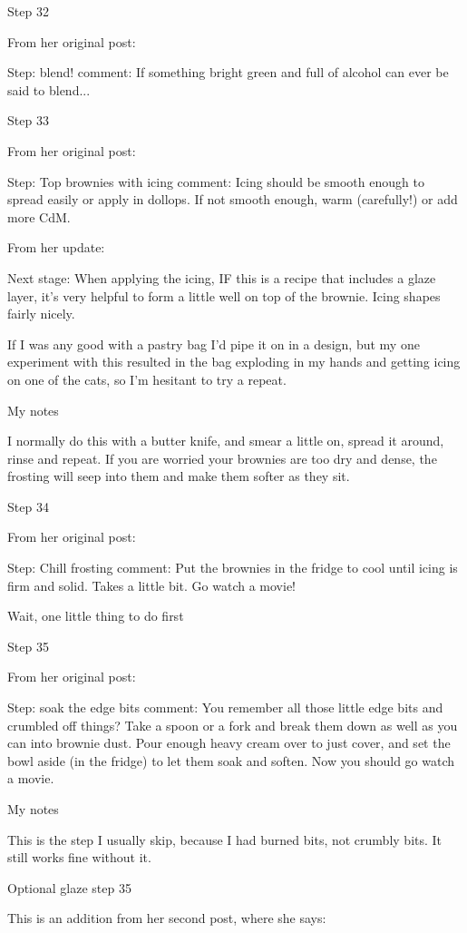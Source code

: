 Step 32

From her original post:

Step: blend!
comment: If something bright green and full of alcohol can ever be said to blend...

Step 33

From her original post:

Step: Top brownies with icing
comment: Icing should be smooth enough to spread easily or apply in dollops. If not smooth enough, warm (carefully!) or add more CdM.

From her update:

Next stage: When applying the icing, IF this is a recipe that includes a glaze layer, it's very helpful to form a little well on top of the brownie. Icing shapes fairly nicely.

If I was any good with a pastry bag I'd pipe it on in a design, but my one experiment with this resulted in the bag exploding in my hands and getting icing on one of the cats, so I'm hesitant to try a repeat.

My notes

I normally do this with a butter knife, and smear a little on, spread it around, rinse and repeat. If you are worried your brownies are too dry and dense, the frosting will seep into them and make them softer as they sit.

Step 34

From her original post:

Step: Chill frosting
comment: Put the brownies in the fridge to cool until icing is firm and solid. Takes a little bit. Go watch a movie!

Wait, one little thing to do first

Step 35

From her original post:

Step: soak the edge bits
comment: You remember all those little edge bits and crumbled off things? Take a spoon or a fork and break them down as well as you can into brownie dust. Pour enough heavy cream over to just cover, and set the bowl aside (in the fridge) to let them soak and soften.
Now you should go watch a movie.

My notes

This is the step I usually skip, because I had burned bits, not crumbly bits. It still works fine without it.

Optional glaze step 35

This is an addition from her second post, where she says:

